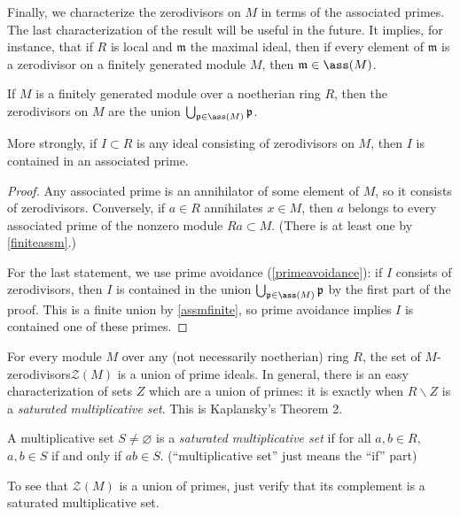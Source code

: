 Finally, we characterize the zerodivisors on $M$ in terms of the associated
primes. The last characterization of the result will be useful in the future.
It implies, for instance, that if $R$ is local and $\mathfrak{m}$ the maximal
ideal, then if every element of $\mathfrak{m}$ is a zerodivisor on a finitely
generated module
$M$, then $\mathfrak{m} \in \ass(M)$.

\begin{proposition} \label{assmdichotomy}
If $M$ is a finitely generated module over a noetherian ring $R$, then the
zerodivisors on $M$ are the union $\bigcup_{\mathfrak{p} \in \ass(M)}
\mathfrak{p}$.

More strongly, if $I \subset R$ is any ideal consisting of zerodivisors on
$M$, then $I$ is contained in an associated prime.
\end{proposition} 
\begin{proof} 
Any associated prime is an annihilator of some element of $M$, so it consists
of zerodivisors. Conversely, if $a \in R$ annihilates $x \in M$, then $a$
belongs to every associated prime of the nonzero module $Ra \subset M$. (There
is at least one by \cref{finiteassm}.)

For the last statement, we use prime avoidance (\cref{primeavoidance}): if $I$ consists of
zerodivisors, then $I$ is contained in the union $\bigcup_{\mathfrak{p} \in \ass(M)}
\mathfrak{p}$ by the first part of the proof. This is a finite union by
\cref{assmfinite}, so prime avoidance implies $I$ is contained one of these
primes.
\end{proof} 


\begin{exercise} 
For every module $M$ over any (not necessarily noetherian) ring $R$,
the set of $M$-zerodivisors$\mathcal{Z}(M)$ is a union of prime ideals. In general, there is an easy
 characterization of sets $Z$ which are a union of primes: it is exactly when
 $R\smallsetminus Z$ is a \emph{saturated multiplicative set}. This is Kaplansky's
 Theorem 2.
 \begin{definition}
   A multiplicative set $S\neq \varnothing$ is a \emph{saturated multiplicative set} if
   for all $a,b\in R$, $a,b\in S$ if and only if $ab\in S$. (``multiplicative set'' just
   means the ``if'' part)
 \end{definition}
 To see that $\mathcal{Z}(M)$ is a union of primes, just verify that its complement is a saturated
 multiplicative set.
\end{exercise}

